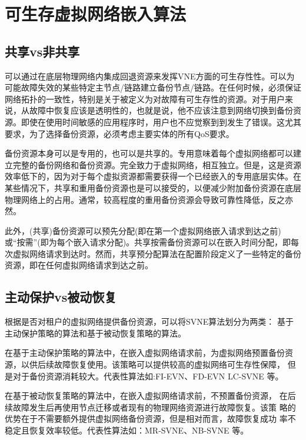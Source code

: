 \section{可生存虚拟网络嵌入算法}
\subsection{共享vs非共享}
可以通过在底层物理网络内集成回退资源来发挥VNE方面的可生存性性。可以为可能故障失效的某些特定主节点/链路建立备份节点/链路。在任何时候，必须保证网络拓扑的一致性，特别是关于被定义为对故障有可生存性的资源。对于用户来说，从故障中恢复应该是透明性的，也就是说，他不应该注意到网络切换到备份资源。即使在使用时间敏感的应用程序时，用户也不应觉察到到发生了错误。这尤其要求，为了选择备份资源，必须考虑主要实体的所有QoS要求。

备份资源本身可以是专用的，也可以是共享的\cite{guo2011shared}。专用意味着每个虚拟网络都可以建立完整的备份网络和备份资源。完全致力于虚拟网络，相互独立。但是，这是资源效率低下的，因为对于每个虚拟资源都需要获得一个已经嵌入的专用底层实体。在某些情况下，共享和重用备份资源也是可以接受的，以便减少附加备份资源在底层物理网络上的占用。通常，较高程度的重用备份资源会导致可靠性降低，反之亦然。

此外，(共享)备份资源可以预先分配(即在第一个虚拟网络嵌入请求到达之前)或“按需”(即为每个嵌入请求分配)。共享按需备份资源可以在嵌入时间分配，即每次虚拟网络请求到达\cite{guo2011shared,yeow2010designing,yu2011cost}时。然而，共享预分配算法在配置阶段定义了一些特定的备份资源，即在任何虚拟网络请求到达之前\cite{rahman2010survivable}。
\subsection{主动保护vs被动恢复}
根据是否对租户的虚拟网络提供备份资源，可以将SVNE算法划分为两类： 基于主动保护策略的算法和基于被动恢复策略的算法\cite{herker2013survey}。

在基于主动保护策略的算法中，在嵌入虚拟网络请求前，为虚拟网络预置备份资源，以供后续故障恢复使用。该策略可以提供较高的虚拟网络可生存性保障， 但是对于备份资源消耗较大。代表性算法如:FI-EVN\cite{yu2011cost}、FD-EVN\cite{wang2014survivable} LC-SVNE\cite{hu2012location} 等。

在基于被动恢复策略的算法中，在嵌入虚拟网络请求前，不预置备份资源， 在后续故障发生后再使用节点迁移或者现有的物理网络资源进行故障恢复。该策 略的优势在于不需要额外提供虚拟网络备份资源，但是相对而言，故障恢复成功 率不稳定且恢复效率较低。代表性算法如：MR-SVNE\cite{qiang2014heuristic}、NB-SVNE\cite{bo2014dynamic} 等。

